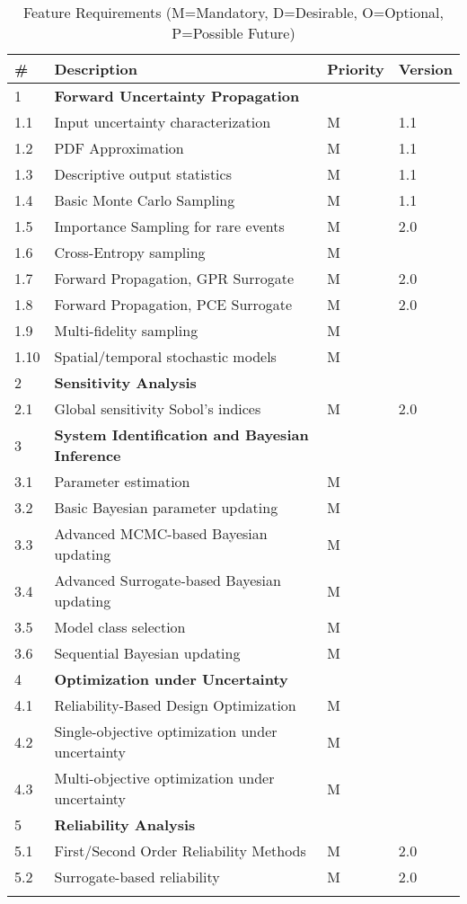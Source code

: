 \newpage
\begin{longtable}{| p{} | p{} | p{} | p{} |}
    \toprule
      \# & Description & Priority & Version \\ \hline
      1 & \textbf{Forward Uncertainty Propagation} &  &  \\ 
	1.1 & Input uncertainty characterization & M & 1.1 \\ \hline
	1.2 & PDF Approximation & M & 1.1 \\ \hline
	1.3 &  Descriptive output statistics & M & 1.1 \\ \hline
	1.4 &  Basic Monte Carlo Sampling  & M & 1.1 \\ \hline	
	1.5 &  Importance Sampling for rare events  & M & 2.0 \\ \hline	
	1.6 &  Cross-Entropy sampling  & M &  \\ \hline
	1.7 &  Forward Propagation, GPR Surrogate  & M & 2.0 \\ \hline
	1.8 &  Forward Propagation, PCE Surrogate  & M & 2.0 \\ \hline
	1.9 &  Multi-fidelity sampling  & M &  \\ \hline
	1.10 &  Spatial/temporal stochastic models  & M &  \\ \hline
	2 & \textbf{Sensitivity Analysis} &  &  \\ \hline
	2.1 & Global sensitivity Sobol's indices & M & 2.0  \\ \hline
	3 & \textbf{System Identification and Bayesian Inference} &  &  \\ \hline
	3.1 & Parameter estimation & M &  \\ \hline
	3.2 & Basic Bayesian parameter updating & M &  \\ \hline
	3.3 & Advanced MCMC-based Bayesian updating & M & \\ \hline
	3.4 & Advanced Surrogate-based Bayesian updating & M &  \\ \hline
	3.5 & Model class selection & M &  \\ \hline
	3.6 & Sequential Bayesian updating & M &  \\ \hline
	4 & \textbf{Optimization under Uncertainty} &  &  \\ \hline
	4.1 & Reliability-Based Design Optimization & M &  \\ \hline
	4.2 & Single-objective optimization under uncertainty & M &  \\ \hline
	4.3 & Multi-objective optimization under uncertainty & M &  \\ \hline
	5 & \textbf{Reliability Analysis} &  &  \\ \hline
	5.1 & First/Second Order Reliability Methods & M & 2.0 \\ \hline
	5.2 & Surrogate-based reliability & M & 2.0 \\ \hline
	\bottomrule
\caption{Feature Requirements (M=Mandatory, D=Desirable, O=Optional, P=Possible Future)}             
  \label{tab:featureRequirements}                 
\end{longtable}
